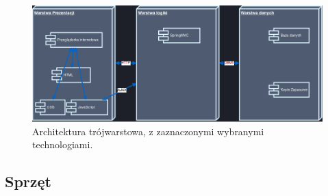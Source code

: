 \begin{figure}[H]
  \includegraphics[width=\textwidth]{images/3tier.png}
  \caption{Architektura trójwarstowa, z zaznaczonymi wybranymi technologiami.}
\end{figure}

\subsection{Sprzęt}

